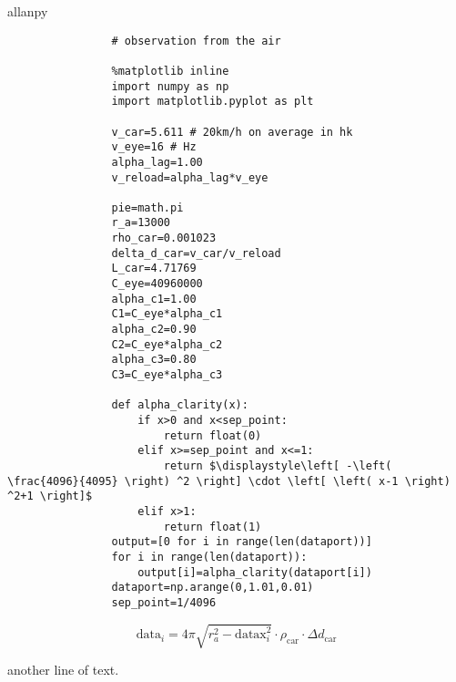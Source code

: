 \documentclass{article}
\begin{document}
        \begin{allanpy}
            allanpy
            \begin{lstlisting}
                # observation from the air

                %matplotlib inline
                import numpy as np
                import matplotlib.pyplot as plt

                v_car=5.611 # 20km/h on average in hk
                v_eye=16 # Hz
                alpha_lag=1.00
                v_reload=alpha_lag*v_eye

                pie=math.pi
                r_a=13000
                rho_car=0.001023
                delta_d_car=v_car/v_reload
                L_car=4.71769
                C_eye=40960000
                alpha_c1=1.00
                C1=C_eye*alpha_c1
                alpha_c2=0.90
                C2=C_eye*alpha_c2
                alpha_c3=0.80
                C3=C_eye*alpha_c3

                def alpha_clarity(x):
                    if x>0 and x<sep_point:
                        return float(0)
                    elif x>=sep_point and x<=1:
                        return $\displaystyle\left[ -\left( \frac{4096}{4095} \right) ^2 \right] \cdot \left[ \left( x-1 \right) ^2+1 \right]$
                    elif x>1:
                        return float(1)
                output=[0 for i in range(len(dataport))]
                for i in range(len(dataport)):
                    output[i]=alpha_clarity(dataport[i])
                dataport=np.arange(0,1.01,0.01)
                sep_point=1/4096
            \end{lstlisting}
            \begin{allaninpseudo}
                \[\mathrm{data}_i=4\pi \sqrt{r_{a}^{2}-\mathrm{datax}_{i}^{2}}\cdot \rho _{\mathrm{car}}\cdot \Delta d_{\mathrm{car}}\]
            \end{allaninpseudo}
        \end{allanpy}
        another line of text.
\end{document}
